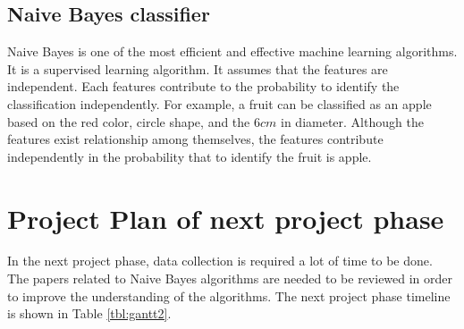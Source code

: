 \subsection{Naive Bayes classifier}
Naive Bayes is one of the most efficient and effective machine learning algorithms. It is a supervised learning algorithm. It assumes that the features are independent. Each features contribute to the probability to identify the classification independently. For example, a fruit can be classified as an apple based on the red color, circle shape, and the $6cm$ in diameter. Although the features exist relationship among themselves, the features contribute independently in the probability that to identify the fruit is apple\cite{sunil:2015}. 

\section{Project Plan of next project phase}
In the next project phase, data collection is required a lot of time to be done. The papers related to Naive Bayes algorithms are needed to be reviewed in order to improve the understanding of the algorithms. The next project phase timeline is shown in Table \ref{tbl:gantt2}.

